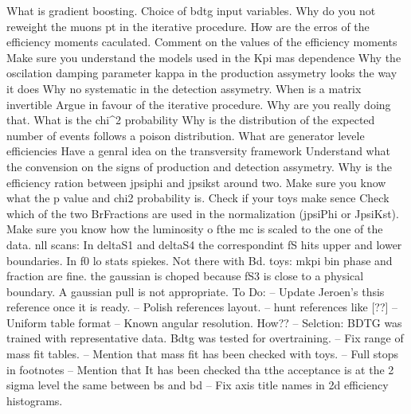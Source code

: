 
What is gradient boosting.
Choice of bdtg input variables.
Why do you not reweight the muons pt in the iterative procedure.
How are the erros of the efficiency moments caculated. 
Comment on the values of the efficiency moments
Make sure you understand the models used in the Kpi mas dependence
Why the oscilation damping parameter kappa in the production assymetry looks the way it does 
Why no systematic in the detection assymetry.
When is a matrix invertible
Argue in favour of the iterative procedure. Why are you really doing that.
What is the chi^2 probability
Why is the distribution of the expected number of events follows a poison distribution.
What are generator levele efficiencies
Have a genral idea on the transversity framework
Understand what the convension on the signs of production and detection assymetry.
Why is the efficiency ration between jpsiphi and jpsikst around two.
Make sure you know what the p value and chi2 probability is.
Check if your toys make sence
Check which of the two BrFractions are used in the normalization (jpsiPhi or JpsiKst).
Make sure you know how the luminosity o fthe mc is scaled to the one of the data.
nll scans: 
    In deltaS1 and deltaS4 the correspondint fS hits upper and lower boundaries.
    In f0 lo stats spiekes. Not there with Bd. 
toys:
    mkpi bin phase and fraction are fine. the gaussian is choped because fS3 is close to a physical boundary. A gaussian pull is not appropriate.
To Do:
-- Update Jeroen's thsis reference once it is ready.
-- Polish references layout.
-- hunt references like [??]
-- Uniform table format
-- Known angular resolution. How??
-- Selction: BDTG was trained with representative data. Bdtg was tested for overtraining.
-- Fix range of mass fit tables.
-- Mention that mass fit has been checked with toys.
-- Full stops in footnotes
-- Mention that It has been checked tha tthe acceptance is at the 2 sigma level the same between bs and bd
-- Fix axis title names in 2d efficiency histograms.


